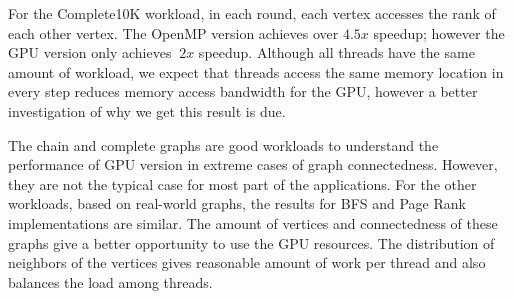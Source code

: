 For the Complete10K workload, in each round, each vertex accesses the rank of each other vertex. The OpenMP version achieves over $4.5x$ speedup; however the GPU version only achieves $~2x$ speedup. Although all threads have the same amount of workload, we expect that threads access the same memory location in every step reduces memory access bandwidth for the GPU, however a better investigation of why we get this result is due.

The chain and complete graphs are good workloads to understand the performance of GPU version in extreme cases of graph connectedness. However, they are not the typical case for most part of the applications. For the other workloads, based on real-world graphs, the results for BFS and Page Rank implementations are similar. The amount of vertices and connectedness of these graphs give a better opportunity to use the GPU resources. The distribution of neighbors of the vertices gives reasonable amount of work per thread and also balances the load among threads.
